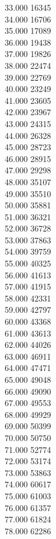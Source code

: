 { 33.000	16345 \\
 34.000	16706 \\
 35.000	17089 \\
 36.000	19438 \\
 37.000	19826 \\
 38.000	22474 \\
 39.000	22769 \\
 40.000	23249 \\
 41.000	23605 \\
 42.000	23967 \\
 43.000	24315 \\
 44.000	26328 \\
 45.000	28723 \\
 46.000	28915 \\
 47.000	29298 \\
 48.000	35107 \\
 49.000	35510 \\
 50.000	35881 \\
 51.000	36321 \\
 52.000	36728 \\
 53.000	37863 \\
 54.000	39759 \\
 55.000	40325 \\
 56.000	41613 \\
 57.000	41915 \\
 58.000	42331 \\
 59.000	42797 \\
 60.000	43368 \\
 61.000	43613 \\
 62.000	44026 \\
 63.000	46911 \\
 64.000	47471 \\
 65.000	49048 \\
 66.000	49090 \\
 67.000	49553 \\
 68.000	49929 \\
 69.000	50399 \\
 70.000	50750 \\
 71.000	52774 \\
 72.000	53174 \\
 73.000	53863 \\
 74.000	60617 \\
 75.000	61003 \\
 76.000	61357 \\
 77.000	61824 \\
 78.000	62286 \\
}
